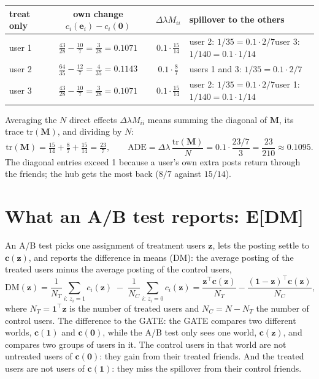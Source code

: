 \documentclass[11pt]{article}
\newcommand{\one}{\mathbf{1}}
\newcommand{\vzero}{\mathbf{0}}
\newcommand{\vc}{\boldsymbol{c}}
\newcommand{\vz}{\boldsymbol{z}}
\newcommand{\ve}{\boldsymbol{e}}
\newcommand{\mM}{\mathbf{M}}
\begin{document}
\begin{center}
\begin{tabular}{lcc>{\raggedright\arraybackslash}p{4.6cm}}
\toprule
treat only & own change $c_i(\ve_i) - c_i(\vzero)$ & $\Delta\lambda M_{ii}$ & spillover to the others \\
\midrule
user 1 & $\tfrac{43}{28} - \tfrac{10}{7} = \tfrac{3}{28} = 0.1071$ & $0.1\cdot\tfrac{15}{14}$ & user 2: $1/35 = 0.1\cdot 2/7$\newline user 3: $1/140 = 0.1\cdot 1/14$ \\[3pt]
user 2 & $\tfrac{64}{35} - \tfrac{12}{7} = \tfrac{4}{35} = 0.1143$ & $0.1\cdot\tfrac{8}{7}$ & users 1 and 3: $1/35 = 0.1\cdot 2/7$ \\[3pt]
user 3 & $\tfrac{43}{28} - \tfrac{10}{7} = \tfrac{3}{28} = 0.1071$ & $0.1\cdot\tfrac{15}{14}$ & user 2: $1/35 = 0.1\cdot 2/7$\newline user 1: $1/140 = 0.1\cdot 1/14$ \\
\bottomrule
\end{tabular}
\end{center}

Averaging the $N$ direct effects $\Delta\lambda M_{ii}$ means summing the diagonal of $\mM$, its trace $\mathrm{tr}(\mM)$, and dividing by $N$:
\[
\mathrm{tr}(\mM) = \tfrac{15}{14} + \tfrac{8}{7} + \tfrac{15}{14} = \tfrac{23}{7},
\qquad
\text{ADE} = \Delta\lambda\,\frac{\mathrm{tr}(\mM)}{N} = 0.1\cdot\frac{23/7}{3} = \frac{23}{210} \approx 0.1095 .
\]
The diagonal entries exceed 1 because a user's own extra posts return through the friends; the hub gets the most back ($8/7$ against $15/14$).

\section{What an A/B test reports: E[DM]}

An A/B test picks one assignment of treatment users $\vz$, lets the posting settle to $\vc(\vz)$, and reports the difference in means (DM): the average posting of the treated users minus the average posting of the control users,
\[
\text{DM}(\vz) = \frac{1}{N_T}\sum_{i:\, z_i = 1} c_i(\vz) \;-\; \frac{1}{N_C}\sum_{i:\, z_i = 0} c_i(\vz)
= \frac{\vz^\top \vc(\vz)}{N_T} - \frac{(\one - \vz)^\top \vc(\vz)}{N_C},
\]
where $N_T = \one^\top\vz$ is the number of treated users and $N_C = N - N_T$ the number of control users.  The difference to the GATE: the GATE compares two different worlds, $\vc(\one)$ and $\vc(\vzero)$, while the A/B test only sees one world, $\vc(\vz)$, and compares two groups of users in it.  The control users in that world are not untreated users of $\vc(\vzero)$: they gain from their treated friends.  And the treated users are not users of $\vc(\one)$: they miss the spillover from their control friends.
\end{document}
